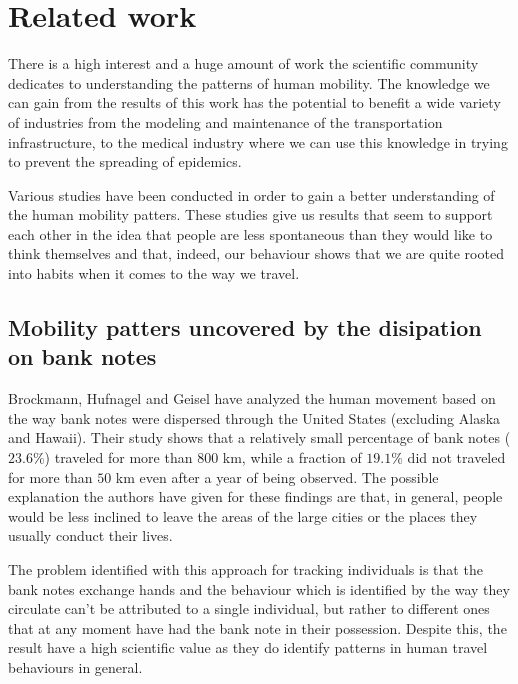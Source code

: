 \chapter{Related work}
\label{relatedwork}
There is a high interest and a huge amount of work the scientific community
dedicates to understanding the patterns of human mobility. The knowledge we can
gain from the results of this work has the potential to benefit a wide variety
of industries from the modeling and maintenance of the transportation
infrastructure, to the medical industry where we can use this knowledge in
trying to prevent the spreading of epidemics. \cite{Brockmann08} %

Various studies have been conducted in order to gain a better understanding of
the human mobility patters. These studies give us results that seem to support
each other in the idea that people are less spontaneous than they would like to
think themselves and that, indeed, our behaviour shows that we are quite rooted
into habits when it comes to the way we travel.

\section{Mobility patters uncovered by the disipation on bank notes}
Brockmann, Hufnagel and Geisel\cite{Brockmann06} have analyzed the human movement
based on the way bank notes were dispersed through the United States (excluding
Alaska and Hawaii). Their study shows that a relatively small percentage of bank
notes ($23.6\%$) traveled for more than $800$ km, while a fraction of $19.1\%$
did not traveled for more than $50$ km even after a year of being observed. The
possible explanation the authors have given for these findings are that, in
general, people would be less inclined to leave the areas of the large cities or
the places they usually conduct their lives.

The problem identified with this approach for tracking individuals is that the
bank notes exchange hands and the behaviour which is identified by the way they
circulate can't be attributed to a single individual, but rather to different
ones that at any moment have had the bank note in their possession. Despite this,
the result have a high scientific value as they do identify patterns in human
travel behaviours in general.


